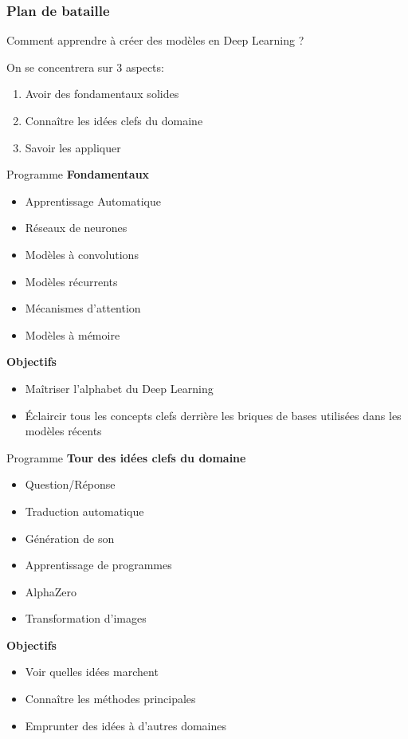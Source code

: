 \documentclass{formation}
\begin{document}
\begin{frame}
  \frametitle{Plan de bataille}
  Comment apprendre à créer des modèles en Deep Learning ?

  On se concentrera sur 3 aspects:
  \begin{enumerate}
  \item Avoir des fondamentaux solides
  \item Connaître les idées clefs du domaine
  \item Savoir les appliquer
  \end{enumerate}
\end{frame}

\begin{frame}{Programme}
  \textbf{Fondamentaux}
  \begin{itemize}
  \item Apprentissage Automatique
  \item Réseaux de neurones
  \item Modèles à convolutions
  \item Modèles récurrents
  \item Mécanismes d'attention
  \item Modèles à mémoire
  \end{itemize}
  \textbf{Objectifs}
  \begin{itemize}
  \item Maîtriser l'alphabet du Deep Learning
  \item Éclaircir tous les concepts clefs derrière les briques de
    bases utilisées dans les modèles récents
  \end{itemize}
\end{frame}

\begin{frame}{Programme}
  \textbf{Tour des idées clefs du domaine}
  \begin{itemize}
  \item Question/Réponse
  \item Traduction automatique
  \item Génération de son
  \item Apprentissage de programmes
  \item AlphaZero
  \item Transformation d'images
  \end{itemize}
  \textbf{Objectifs}
  \begin{itemize}
  \item Voir quelles idées marchent
  \item Connaître les méthodes principales
  \item Emprunter des idées à d'autres domaines
  \end{itemize}
\end{frame}
\end{document}
